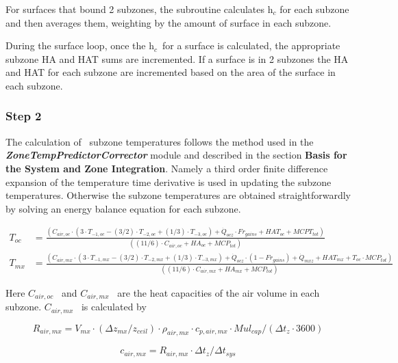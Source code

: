 For surfaces that bound 2 subzones, the subroutine calculates h\(_{c}\) for each subzone and then averages them, weighting by the amount of surface in each subzone.

During the surface loop, once the h\(_{c}\)~for a surface is calculated, the appropriate subzone HA and HAT sums are incremented. If a surface is in 2 subzones the HA and HAT for each subzone are incremented based on the area of the surface in each subzone.

\subsubsection{Step 2}\label{step-2}

The calculation of~ subzone temperatures follows the method used in the \textbf{\emph{ZoneTempPredictorCorrector}} module and described in the section \textbf{Basis for the System and Zone Integration}. Namely a third order finite difference expansion of the temperature time derivative is used in updating the subzone temperatures. Otherwise the subzone temperatures are obtained straightforwardly by solving an energy balance equation for each subzone.

\begin{equation}
  \begin{array}{cl}
    T_{oc} & = \frac{(C_{air,oc} \cdot (3 \cdot T_{ - 1,oc} - (3/2) \cdot T_{ - 2,oc} + (1/3) \cdot T_{ - 3,oc}) + \dot Q_{ocz} \cdot Fr_{gains} + HAT_{oc} + MCPT_{tot})} {((11/6) \cdot C_{air,oc} + HA_{oc} + MCP_{tot})} \\
    T_{mx} & = \frac{(C_{air,mx} \cdot (3 \cdot T_{ - 1,mx} - (3/2) \cdot T_{ - 2,mx} + (1/3) \cdot T_{ - 3,mx}) + \dot Q_{ocz} \cdot (1 - Fr_{gains}) + \dot Q_{mxz} + HAT_{mx} + T_{oc} \cdot MCP_{tot})} {((11/6) \cdot C_{air,mx} + HA_{mx} + MCP_{tot})}
  \end{array}
\end{equation}

Here \({C_{air,oc}}\) ~and \({C_{air,mx}}\) ~are the heat capacities of the air volume in each subzone. \({C_{air,mx}}\) ~is calculated by

\begin{equation}
{R_{air,mx}} = {V_{mx}} \cdot \left( {\Delta {z_{mx}}/{z_{ceil}}} \right) \cdot {\rho_{air,mx}} \cdot {c_{p,air,mx}} \cdot Mu{l_{cap}}/\left( {\Delta {t_z} \cdot 3600} \right)
\end{equation}

\begin{equation}
{c_{air,mx}} = {R_{air,mx}} \cdot \Delta {t_z}/\Delta {t_{sys}}
\end{equation}

